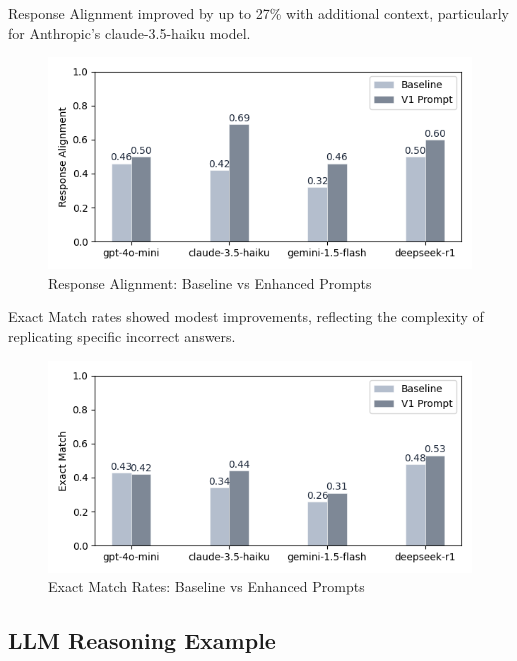 \documentclass[
    a4paper, %
    10pt, %
    twoside %
]{LTJournalArticle}
\begin{document}
Response Alignment improved by up to 27\% with additional context, particularly for Anthropic's claude-3.5-haiku model. 

\begin{figure}[H]
    \centering
    \includegraphics[width=\columnwidth]{../latex/images/response_alignment_comparison.png}
    \caption{Response Alignment: Baseline vs Enhanced Prompts}
    \label{fig:response-alignment}
\end{figure}

Exact Match rates showed modest improvements, reflecting the complexity of replicating specific incorrect answers.

\begin{figure}[H]
    \centering
    \includegraphics[width=\columnwidth]{../latex/images/exact_match_comparison.png}
    \caption{Exact Match Rates: Baseline vs Enhanced Prompts}
    \label{fig:exact-match}
\end{figure}

\subsection{LLM Reasoning Example}
\end{document}
